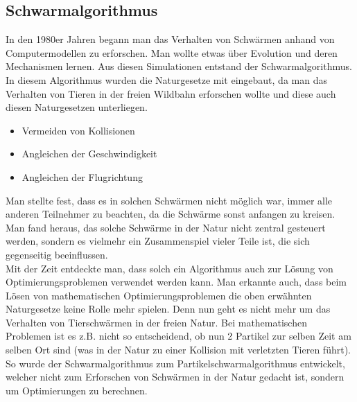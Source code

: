 \subsection{Schwarmalgorithmus}

In den 1980er Jahren begann man das Verhalten von Schwärmen anhand von Computermodellen zu erforschen. Man wollte etwas über Evolution und deren Mechanismen lernen. Aus diesen Simulationen entstand der Schwarmalgorithmus.
In diesem Algorithmus wurden die Naturgesetze mit eingebaut, da man das Verhalten von Tieren in der freien Wildbahn erforschen wollte und diese auch diesen Naturgesetzen unterliegen.

\begin{itemize}
\item Vermeiden von Kollisionen 
\item Angleichen der Geschwindigkeit
\item Angleichen der Flugrichtung
\end{itemize}

Man stellte fest, dass es in solchen Schwärmen nicht möglich war, immer alle anderen Teilnehmer zu beachten, da die Schwärme sonst anfangen zu kreisen. Man fand heraus, das solche Schwärme in der Natur nicht zentral gesteuert werden, sondern es vielmehr ein Zusammenspiel vieler Teile ist, die sich gegenseitig beeinflussen.\\
Mit der Zeit entdeckte man, dass solch ein Algorithmus auch zur Lösung von Optimierungsproblemen verwendet werden kann.
Man erkannte auch, dass beim Lösen von mathematischen Optimierungsproblemen die oben erwähnten Naturgesetze keine Rolle mehr spielen. Denn nun geht es nicht mehr um das Verhalten von Tierschwärmen in der freien Natur. Bei mathematischen Problemen ist es z.B. nicht so entscheidend, ob nun 2 Partikel zur selben Zeit am selben Ort sind (was in der Natur zu einer Kollision mit verletzten Tieren führt). So wurde der Schwarmalgorithmus zum Partikelschwarmalgorithmus entwickelt, welcher nicht zum Erforschen von Schwärmen in der Natur gedacht ist, sondern um Optimierungen zu berechnen.